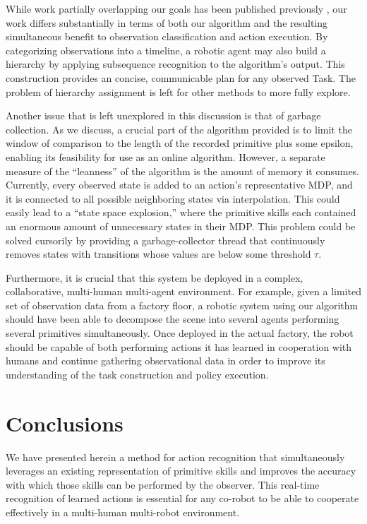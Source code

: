 \documentclass[letterpaper]{article}
\begin{document}
While work partially overlapping our goals has been published previously
\cite{LearningBehaviorFusion}, our work differs substantially in terms of both
our algorithm and the resulting simultaneous benefit to observation
classification and action execution. By categorizing observations into a timeline, a robotic agent may also build a hierarchy by applying subsequence recognition to the algorithm's output. This construction provides an concise, communicable plan for any observed Task. The problem of hierarchy assignment is left for other methods to more fully explore.

Another issue that is left unexplored in this discussion is that of garbage collection.  As we discuss, a crucial part of the algorithm provided is to limit the window of comparison to the length of the recorded primitive plus some epsilon, enabling its feasibility for use as an online algorithm.  However, a separate measure of the ``leanness'' of the algorithm is the amount of memory it consumes.  Currently, every observed state is added to an action's representative MDP, and it is connected to all possible neighboring states via interpolation.  This could easily lead to a ``state space explosion,'' where the primitive skills each contained an enormous amount of unnecessary states in their MDP.  This problem could be solved cursorily by providing a garbage-collector thread that continuously removes states with transitions whose values are below some threshold $\tau$.

Furthermore, it is crucial that this system be deployed in a complex, collaborative, multi-human multi-agent environment.  For example, given a limited set of observation data from a factory floor, a robotic system using our algorithm should have been able to decompose the scene into several agents performing several primitives simultaneously.  Once deployed in the actual factory, the robot should be capable of both performing actions it has learned in cooperation with humans and continue gathering observational data in order to improve its understanding of the task construction and policy execution.


\section{Conclusions}
\label{sec:conclusions}
We have presented herein a method for action recognition that simultaneously leverages an existing representation of primitive skills and improves the accuracy with which those skills can be performed by the observer.  This real-time recognition of learned actions is essential for any co-robot to be able to cooperate effectively in a multi-human multi-robot environment.  
\end{document}
